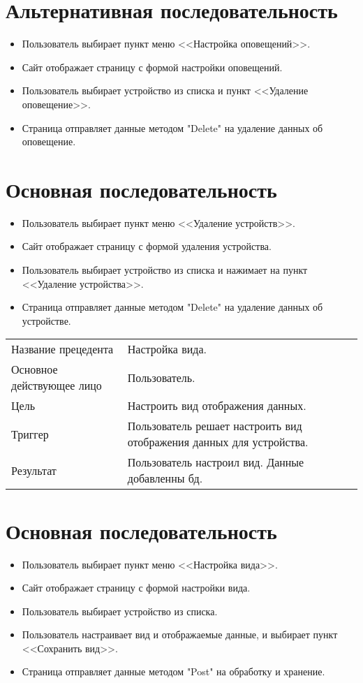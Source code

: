 \section{Альтернативная последовательность}
\begin{itemize}
    \item Пользователь выбирает пункт меню <<Настройка оповещений>>.
    \item Сайт отображает страницу с формой настройки оповещений.
    \item Пользователь выбирает устройство из списка и пункт <<Удаление оповещение>>.
    \item Страница отправляет данные методом "Delete" на удаление данных об оповещение. 
\end{itemize}

\section{Основная последовательность}
\begin{itemize}
    \item Пользователь выбирает пункт меню <<Удаление устройств>>.
    \item Сайт отображает страницу с формой удаления устройства.
    \item Пользователь выбирает устройство из списка и нажимает на пункт <<Удаление устройства>>.
    \item Страница отправляет данные методом "Delete" на удаление данных об устройстве. 
\end{itemize}

\begin{table}[]
    \begin{tabular}{ll}
    Название прецедента       & Настройка вида.\\
    Основное действующее лицо & Пользователь.\\
    Цель                      & Настроить вид отображения данных.\\
    Триггер                   & Пользователь решает настроить вид отображения данных для устройства.\\
    Результат                 & Пользователь настроил вид. Данные добавленны бд.
    \end{tabular}
\end{table}

\section{Основная последовательность}
\begin{itemize}
    \item Пользователь выбирает пункт меню <<Настройка вида>>.
    \item Сайт отображает страницу с формой настройки вида.
    \item Пользователь выбирает устройство из списка.
    \item Пользователь настраивает вид и отображаемые данные, и выбирает пункт <<Сохранить вид>>. 
    \item Страница отправляет данные методом "Post" на обработку и хранение. 
\end{itemize}

